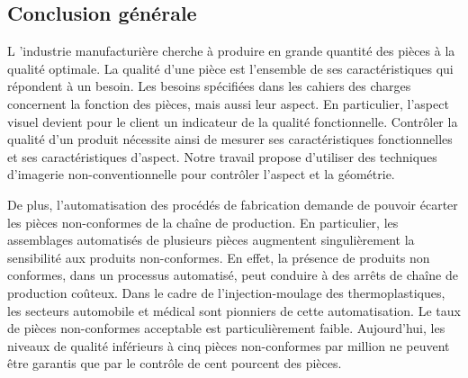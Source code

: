 

{}

\vspace*{-1cm}
\begin{flushright}
\section*{\fontsize{20pt}{20pt}\selectfont\textnormal{Conclusion générale}}
\end{flushright}
\vspace{2cm}

\chead[\fancyplain{}{}]
      {\fancyplain{}{}}
\lfoot[\fancyplain{}{}]
      {\fancyplain{}{}}
\cfoot[\fancyplain{}{\thepage}]
      {\fancyplain{}{\thepage}}
\rfoot[\fancyplain{}{}]
     {\fancyplain{}{\scriptsize}}

\label{ch:conclusion}
\lettrine[lines=1]{L}{ }'industrie manufacturière cherche à produire en grande quantité des pièces à la qualité optimale.
La qualité d'une pièce est l'ensemble de ses caractéristiques qui répondent à un besoin.
Les besoins spécifiées dans les cahiers des charges concernent la fonction des pièces, mais aussi leur aspect.
En particulier, l'aspect visuel devient pour le client un indicateur de la qualité fonctionnelle.
Contrôler la qualité d'un produit nécessite ainsi de mesurer ses caractéristiques fonctionnelles et ses caractéristiques d'aspect.
Notre travail propose d'utiliser des techniques d'imagerie non-conventionnelle pour contrôler l'aspect et la géométrie.

De plus, l'automatisation des procédés de fabrication demande de pouvoir écarter les pièces non-conformes de la chaîne de production.
En particulier, les assemblages automatisés de plusieurs pièces augmentent singulièrement la sensibilité aux produits non-conformes.
En effet, la présence de produits non conformes, dans un processus automatisé, peut conduire à des arrêts de chaîne de production coûteux.
Dans le cadre de l'injection-moulage des thermoplastiques, les secteurs automobile et médical sont pionniers de cette automatisation.
Le taux de pièces non-conformes acceptable est particulièrement faible.
Aujourd'hui, les niveaux de qualité inférieurs à cinq pièces non-conformes par million ne peuvent être garantis que par le contrôle de cent pourcent des pièces.  %

